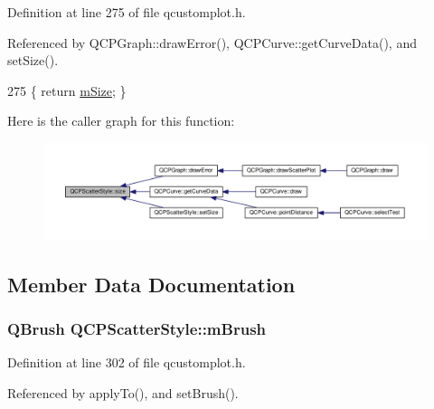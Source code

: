 Definition at line 275 of file qcustomplot.\+h.



Referenced by Q\+C\+P\+Graph\+::draw\+Error(), Q\+C\+P\+Curve\+::get\+Curve\+Data(), and set\+Size().


\begin{DoxyCode}
275 \{ \textcolor{keywordflow}{return} \hyperlink{class_q_c_p_scatter_style_a757da98671eb06b221979373ac2cec91}{mSize}; \}
\end{DoxyCode}


Here is the caller graph for this function\+:\nopagebreak
\begin{figure}[H]
\begin{center}
\leavevmode
\includegraphics[width=350pt]{class_q_c_p_scatter_style_a1973ee650368f1c5f55507b78473f634_icgraph}
\end{center}
\end{figure}




\subsection{Member Data Documentation}
\hypertarget{class_q_c_p_scatter_style_a1b9c6ab10aebcaf236f1f45d1d6d64d1}{}
\subsubsection[{m\+Brush}]{\setlength{\rightskip}{0pt plus 5cm}Q\+Brush Q\+C\+P\+Scatter\+Style\+::m\+Brush\hspace{0.3cm}{\ttfamily [protected]}}\label{class_q_c_p_scatter_style_a1b9c6ab10aebcaf236f1f45d1d6d64d1}


Definition at line 302 of file qcustomplot.\+h.



Referenced by apply\+To(), and set\+Brush().

\hypertarget{class_q_c_p_scatter_style_a813cb074744dc5a2f59cc99d6a10c6f0}{}
